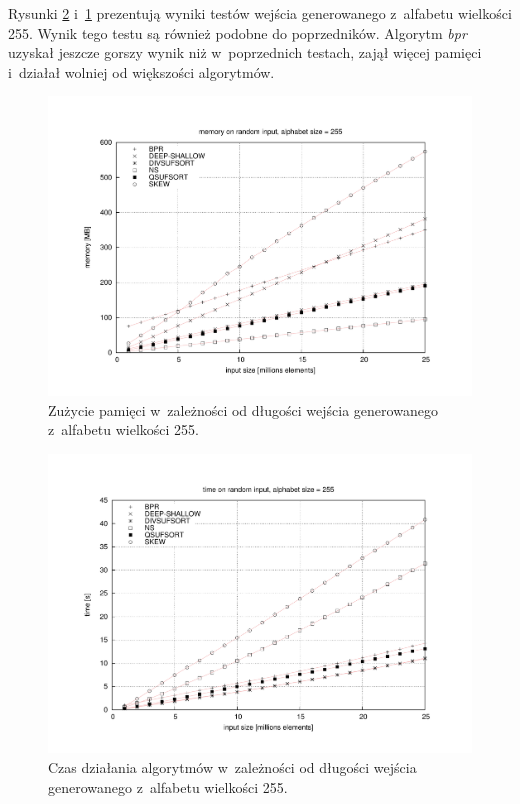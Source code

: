 Rysunki \ref{rys:random-input-time-255} i~\ref{rys:random-input-memory-255} prezentują wyniki testów
wejścia generowanego z~alfabetu wielkości 255. Wynik tego testu są również podobne do poprzedników.
Algorytm \emph{bpr} uzyskał jeszcze gorszy wynik niż w~poprzednich testach, zajął więcej pamięci
i~działał wolniej od większości algorytmów.

\begin{figure}[tp]
       \begin{center}
          \includegraphics[width=\linewidth]{figures/results/random-input-memory-255.pdf}
        \end{center}        
    \caption{Zużycie pamięci w~zależności od długości wejścia generowanego z~alfabetu wielkości 255.}%
    \label{rys:random-input-memory-255}
\end{figure}

\begin{figure}[tp]
       \begin{center}
            \includegraphics[width=\linewidth]{figures/results/random-input-time-255.pdf}
        \end{center}        
    \caption{Czas działania algorytmów w~zależności od długości wejścia generowanego z~alfabetu wielkości 255.}%
    \label{rys:random-input-time-255}
\end{figure} 


